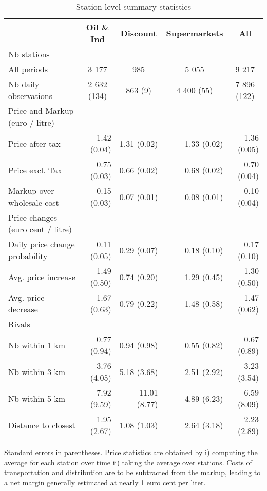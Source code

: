 \documentclass[english]{article}
\begin{document}
\begin{table}
\caption{Station-level summary statistics}
\label{tab:station_stats_des}
\begin{threeparttable}
    \begin{tabular}{lrrrr}
    \toprule
    \toprule
          & \multicolumn{1}{c}{Oil \& Ind} & \multicolumn{1}{c}{Discount} & \multicolumn{1}{c}{Supermarkets} & \multicolumn{1}{c}{All} \\
    \midrule
    Nb stations &       &       &       &  \\
    All periods & \multicolumn{1}{c}{3 177} & \multicolumn{1}{c}{985} & \multicolumn{1}{c}{5 055} & \multicolumn{1}{c}{9 217} \\
    Nb daily observations & \multicolumn{1}{c}{2 632 (134)} & \multicolumn{1}{c}{863 (9)} & \multicolumn{1}{c}{4 400 (55)} & \multicolumn{1}{c}{7 896 (122)} \\
    \midrule
    Price and Markup (euro / litre) &       &       &       &  \\
    Price after tax & 1.42 (0.04) & 1.31 (0.02) & 1.33 (0.02) & 1.36 (0.05) \\
    Price excl. Tax & 0.75 (0.03) & 0.66 (0.02) & 0.68 (0.02) & 0.70 (0.04) \\
    Markup over wholesale cost & 0.15 (0.03) & 0.07 (0.01) & 0.08 (0.01) & 0.10 (0.04) \\
    \midrule
    Price changes (euro cent / litre) &       &       &       &  \\
    Daily price change probability & 0.11 (0.05) & 0.29 (0.07) & 0.18 (0.10) & 0.17 (0.10) \\
    Avg. price increase & 1.49 (0.50) & 0.74 (0.20) & 1.29 (0.45) & 1.30 (0.50) \\
    Avg. price decrease & 1.67 (0.63) & 0.79 (0.22) & 1.48 (0.58) & 1.47 (0.62) \\
    \midrule
    Rivals &       &       &       &  \\
    Nb within 1 km & 0.77 (0.94) & 0.94 (0.98) & 0.55 (0.82) & 0.67 (0.89) \\
    Nb within 3 km & 3.76 (4.05) & 5.18 (3.68) & 2.51 (2.92) & 3.23 (3.54) \\
    Nb within 5 km & 7.92 (9.59) & 11.01 (8.77) & 4.89 (6.23) & 6.59 (8.09) \\
    Distance to closest & 1.95 (2.67) & 1.08 (1.03) & 2.64 (3.18) & 2.23 (2.89) \\
   \bottomrule
   \bottomrule
\end{tabular}
\begin{tablenotes}
			\small
			\item Standard errors in parentheses. Price statistics are obtained by i) computing the average for each station over time ii) taking the average over stations. Costs of transportation and distribution are to be subtracted from the markup, leading to a net margin generally estimated at nearly 1 euro cent per liter.
\end{tablenotes}
\end{threeparttable}
\end{table}
\end{document}
